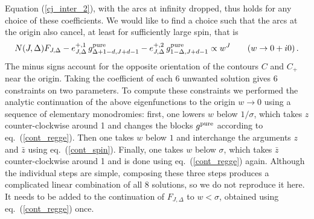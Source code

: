 \documentclass[11pt, reqno,preprint]{article}
\def\be{\begin{equation}}
\def\ee{\end{equation}}
\def\gpure{g^{\rm pure}}
\def\zbar{\bar{z}}
\def\j{J}
\begin{document}
Equation (\ref{cj_inter_2}), with the arcs at infinity dropped, thus holds for any choice of these coefficients.
We would like to find a choice such that the arcs at the origin also cancel, at least for sufficiently large spin,
that is
\be
 N(\j,\Delta) F_{\j,\Delta} -
 e^{+,1}_{\j,\Delta}\, \gpure_{\Delta+1-d,\j+d-1}
-e^{+,2}_{\j,\Delta}\, \gpure_{1-\Delta,\j+d-1} \propto w^{\j}  \qquad (w\to 0+i0)\,.
\ee
The minus signs account for the opposite orientation of the contours $C$ and $C_+$ near the origin.
Taking the coefficient of each 6 unwanted solution gives 6 constraints on two parameters.
To compute these constraints we performed the analytic continuation of the above
eigenfunctions to the origin $w\to 0$ using
a sequence of elementary monodromies: first, one lowers $w$ below $1/\sigma$, which takes $z$ counter-clockwise around 1 and changes the blocks $\gpure$
according to eq.~(\ref{cont_regge}). Then one takes $w$ below $1$ and interchange the arguments $z$ and $\zbar$ using eq.~(\ref{cont_spin}).
Finally, one takes $w$ below $\sigma$, which takes $\zbar$ counter-clockwise around 1 and is done using eq.~(\ref{cont_regge}) again.
Although the individual steps are simple, composing these three steps produces a complicated linear combination of all 8 solutions,
so we do not reproduce it here.  It needs to be added to the continuation of $F_{\j,\Delta}$
to $w<\sigma$, obtained using eq.~(\ref{cont_regge}) once.
\end{document}
